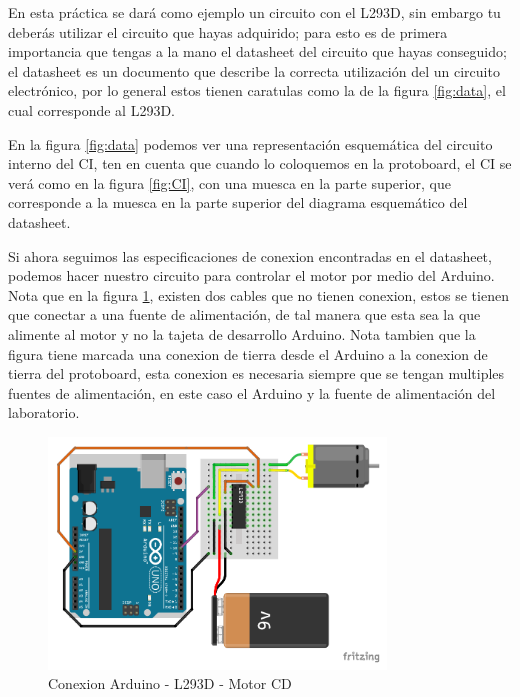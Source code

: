 		En esta práctica se dará como ejemplo un circuito con el L293D, sin embargo tu deberás utilizar el circuito que hayas adquirido; para esto es de primera importancia que tengas a la mano el datasheet del circuito que hayas conseguido; el datasheet es un documento que describe la correcta utilización del un circuito electrónico, por lo general estos tienen caratulas como la de la figura \ref{fig:data}, el cual corresponde al L293D.

		En la figura \ref{fig:data} podemos ver una representación esquemática del circuito interno del CI, ten en cuenta que cuando lo coloquemos en la protoboard, el CI se verá como en la figura \ref{fig:CI}, con una muesca en la parte superior, que corresponde a la muesca en la parte superior del diagrama esquemático del datasheet.

		Si ahora seguimos las especificaciones de conexion encontradas en el datasheet, podemos hacer nuestro circuito para controlar el motor por medio del Arduino. Nota que en la figura \ref{fig:motor_arduino}, existen dos cables que no tienen conexion, estos se tienen que conectar a una fuente de alimentación, de tal manera que esta sea la que alimente al motor y no la tajeta de desarrollo Arduino. Nota tambien que la figura tiene marcada una conexion de tierra desde el Arduino a la conexion de tierra del protoboard, esta conexion es necesaria siempre que se tengan multiples fuentes de alimentación, en este caso el Arduino y la fuente de alimentación del laboratorio.

		\begin{figure}
			\begin{center}
				\includegraphics[width=0.8\textwidth]{images/Arduino-L293D-CD.pdf}
				\caption{Conexion Arduino - L293D - Motor CD}
				\label{fig:motor_arduino}
			\end{center}
		\end{figure}


